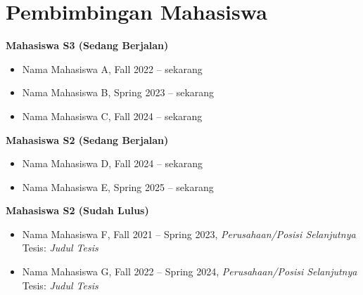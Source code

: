 \section{Pembimbingan Mahasiswa}

\noindent\textbf{Mahasiswa S3 (Sedang Berjalan)}
\begin{itemize}
  \item Nama Mahasiswa A, Fall 2022 -- sekarang
  \item Nama Mahasiswa B, Spring 2023 -- sekarang
  \item Nama Mahasiswa C, Fall 2024 -- sekarang
\end{itemize}

\noindent\textbf{Mahasiswa S2 (Sedang Berjalan)}
\begin{itemize}
  \item Nama Mahasiswa D, Fall 2024 -- sekarang
  \item Nama Mahasiswa E, Spring 2025 -- sekarang
\end{itemize}

\noindent\textbf{Mahasiswa S2 (Sudah Lulus)}
\begin{itemize}
  \item Nama Mahasiswa F, Fall 2021 -- Spring 2023, \textit{Perusahaan/Posisi Selanjutnya}\\
        Tesis: \textit{Judul Tesis}
  \item Nama Mahasiswa G, Fall 2022 -- Spring 2024, \textit{Perusahaan/Posisi Selanjutnya}\\
        Tesis: \textit{Judul Tesis}
\end{itemize}
